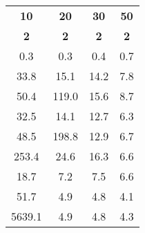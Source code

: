 \begin{tabular}{|c|c|c|c|}
\toprule
    \textbf{10} &    \textbf{20} &   \textbf{30} &  \textbf{50} \\
    \textbf{2}&    \textbf{2}&   \textbf{2}&  \textbf{2}\\
\midrule
   0.3 &   0.3 &  0.4 & 0.7 \\
  33.8 &  15.1 & 14.2 & 7.8 \\
  50.4 & 119.0 & 15.6 & 8.7 \\
  \cellcolor{\secondcolor}32.5 &  14.1 & 12.7 & 6.3 \\
  48.5 & 198.8 & 12.9 & 6.7 \\
 253.4 &  24.6 & 16.3 & 6.6 \\
  \cellcolor{\firstcolor}18.7 &   \cellcolor{\secondcolor}7.2 &  \cellcolor{\secondcolor}7.5 & 6.6 \\
  51.7 &   \cellcolor{\firstcolor}4.9 &  \cellcolor{\firstcolor}4.8 & \cellcolor{\firstcolor}4.1 \\
5639.1 &   \cellcolor{\firstcolor}4.9 &  \cellcolor{\firstcolor}4.8 & \cellcolor{\secondcolor}4.3 \\
\bottomrule
\end{tabular}
